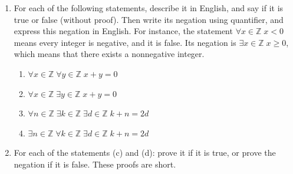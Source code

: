 \documentclass{article}
\newcommand{\Z}{\mathbb{Z}}
\theoremstyle{definition}
\begin{document}
\begin{question}
\begin{enumerate}
	\item For each of the following statements, describe it in English, and say if it is true or false (without proof). Then write its negation using quantifier, and express this negation in English. For instance, the statement $\forall x \in \Z \; x < 0$ means every integer is negative, and it is false. Its negation is $\exists x \in \Z \; x \geq 0$, which means that there exists a nonnegative integer.
	
	\begin{enumerate}
		\item $\forall x \in \Z \; \forall y \in \Z \; x + y = 0$
		\item $\forall x \in \Z \; \exists y \in \Z \; x + y = 0$
		\item $\forall n \in \Z \; \exists k \in \Z \; \exists d \in \Z \; k+ n = 2d$
		\item $\exists n \in \Z \; \forall k \in \Z \; \exists d \in \Z \; k+ n = 2d$
	\end{enumerate}
	
	\item For each of the statements (c) and (d): prove it if it is true, or prove the negation if it is false. These proofs are short.
\end{enumerate}
\end{question}
\end{document}
